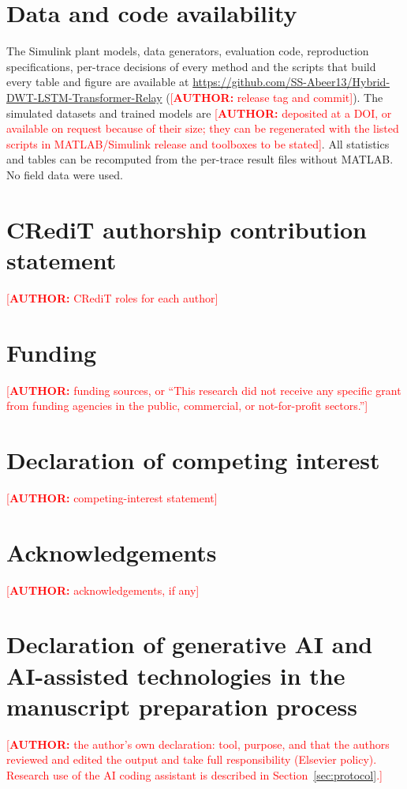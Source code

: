 \documentclass[preprint,12pt]{elsarticle}
\newcommand{\placeholder}[1]{\textcolor{red}{[\textbf{AUTHOR:} #1]}}
\begin{document}
\section*{Data and code availability}
The Simulink plant models, data generators, evaluation code, reproduction specifications, per-trace decisions of every method and the scripts that build every table and figure are available at \url{https://github.com/SS-Abeer13/Hybrid-DWT-LSTM-Transformer-Relay} (\placeholder{release tag and commit}). The simulated datasets and trained models are \placeholder{deposited at a DOI, or available on request because of their size; they can be regenerated with the listed scripts in MATLAB/Simulink release and toolboxes to be stated}. All statistics and tables can be recomputed from the per-trace result files without MATLAB. No field data were used.

\section*{CRediT authorship contribution statement}
\placeholder{CRediT roles for each author}

\section*{Funding}
\placeholder{funding sources, or ``This research did not receive any specific grant from funding agencies in the public, commercial, or not-for-profit sectors.''}

\section*{Declaration of competing interest}
\placeholder{competing-interest statement}

\section*{Acknowledgements}
\placeholder{acknowledgements, if any}

\section*{Declaration of generative AI and AI-assisted technologies in the manuscript preparation process}
\placeholder{the author's own declaration: tool, purpose, and that the authors reviewed and edited the output and take full responsibility (Elsevier policy). Research use of the AI coding assistant is described in Section~\ref{sec:protocol}.}



\end{document}
